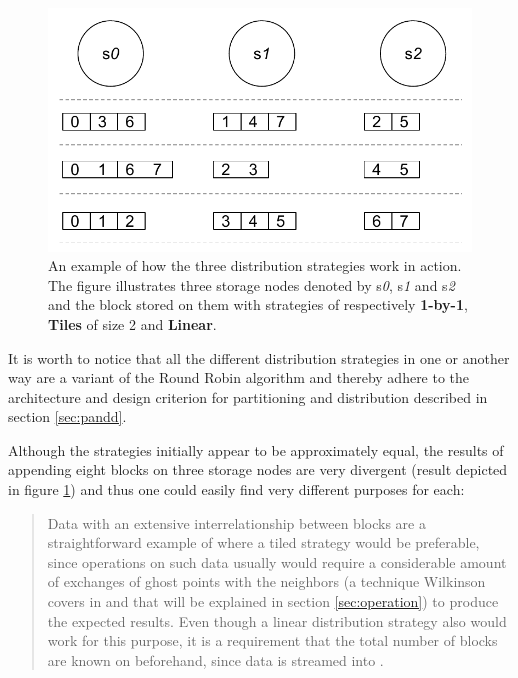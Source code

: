 \begin{figure}[ht!]
	\centering
	\includegraphics[scale=0.85]{pdf/distribution-strategies.pdf}
	\vspace*{3mm}
	\caption[Distribution strategies]{An example of how the three distribution strategies work in action. The figure illustrates three storage nodes denoted by s\textit{0}, s\textit{1} and s\textit{2} and the block stored on them with strategies of respectively \textbf{1-by-1}, \textbf{Tiles} of size 2 and \textbf{Linear}. \label{fig:distribution-strategies}}
\end{figure}	

It is worth to notice that all the different distribution strategies in one or another way are a variant of the Round Robin algorithm and thereby adhere to the architecture and design criterion for partitioning and distribution described in section \ref{sec:pandd}.
\newline

Although the strategies initially appear to be approximately equal, the results of appending eight blocks on three storage nodes are very divergent (result depicted in figure \ref{fig:distribution-strategies}) and thus one could easily find very different purposes for each:

\begin{quotation}
Data with an extensive interrelationship between blocks are a straightforward example of where a tiled strategy would be preferable, since operations on such data usually would require a considerable amount of exchanges of ghost points with the neighbors (a technique Wilkinson \etal covers in \cite{Wilkinson:1998:PPT:289352} and that will be explained in section \ref{sec:operation}) to produce the expected results. Even though a linear distribution strategy also would work for this purpose, it is a requirement that the total number of blocks are known on beforehand, since data is streamed into \CodeName.
\end{quotation}

